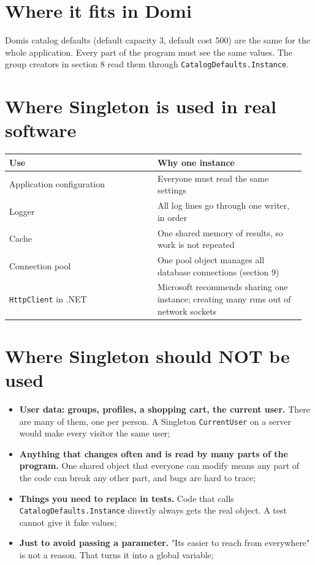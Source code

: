 \documentclass{utmreport}
\providecommand{\tightlist}{\setlength{\itemsep}{0pt}\setlength{\parskip}{0pt}}
\providecommand{\passthrough}[1]{#1}
\newcounter{none}
\begin{document}
\section{Where it fits in Domi}

Domi\textquotesingle s catalog defaults (default capacity 3, default cost 500) are the same for the whole application. Every part of the program must see the same values. The group creators in section 8 read them through \passthrough{\lstinline!CatalogDefaults.Instance!}.

\section{Where Singleton is used in real software}

{\def\LTcaptype{none} %
\begin{longtable}[]{@{}>{\raggedright\arraybackslash}p{0.480\linewidth}>{\raggedright\arraybackslash}p{0.480\linewidth}@{}}
\toprule\noalign{}
Use & Why one instance \\
\midrule\noalign{}
\endhead
\bottomrule\noalign{}
\endlastfoot
Application configuration & Everyone must read the same settings \\
Logger & All log lines go through one writer, in order \\
Cache & One shared memory of results, so work is not repeated \\
Connection pool & One pool object manages all database connections (section 9) \\
\passthrough{\lstinline!HttpClient!} in .NET & Microsoft recommends sharing one instance; creating many runs out of network sockets \\
\end{longtable}
}

\section{Where Singleton should NOT be used}

\begin{itemize}
\tightlist
\item \textbf{User data: groups, profiles, a shopping cart, the current user.} There are many of them, one per person. A Singleton \passthrough{\lstinline!CurrentUser!} on a server would make every visitor the same user;
\item \textbf{Anything that changes often and is read by many parts of the program.} One shared object that everyone can modify means any part of the code can break any other part, and bugs are hard to trace;
\item \textbf{Things you need to replace in tests.} Code that calls \passthrough{\lstinline!CatalogDefaults.Instance!} directly always gets the real object. A test cannot give it fake values;
\item \textbf{Just to avoid passing a parameter.} "It\textquotesingle s easier to reach from everywhere" is not a reason. That turns it into a global variable;
\end{itemize}
\end{document}
